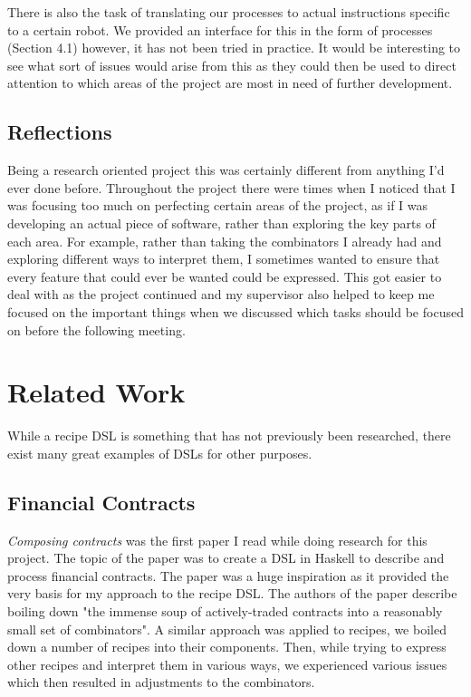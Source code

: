 \documentclass[11pt]{article}
\begin{document}
\medbreak

There is also the task of translating our processes to actual instructions specific to a certain
robot. We provided an interface for this in the form of processes (Section 4.1) however, it has not
been tried in practice. It would be interesting to see what sort of issues would arise from this
as they could then be used to direct attention to which areas of the project are most in need of
further development.

\subsection{Reflections}

Being a research oriented project this was certainly different from anything I'd ever done before.
Throughout the project there were times when I noticed that I was focusing too much on perfecting
certain areas of the project, as if I was developing an actual piece of software, rather than
exploring the key parts of each area. For example, rather than taking the combinators I already
had and exploring different ways to interpret them, I sometimes wanted to ensure that every feature
that could ever be wanted could be expressed. This got easier to deal with as the project
continued and my supervisor also helped to keep me focused on the important things when we discussed
which tasks should be focused on before the following meeting.

\section{Related Work}

While a recipe DSL is something that has not previously been researched, there exist many
great examples of DSLs for other purposes.

\subsection{Financial Contracts}

\textit{Composing contracts} \cite{contracts} was the first paper I read while doing
research for this project. The topic of the paper was to create a DSL in
Haskell to describe and process financial contracts. The paper was a huge
inspiration as it provided the very basis for my approach to the recipe DSL.
The authors of the paper describe boiling down "the immense soup of
actively-traded contracts into a reasonably small set of combinators".
A similar approach was applied to recipes, we boiled down a number of
recipes into their components. Then, while trying to express other
recipes and interpret them in various ways, we experienced various
issues which then resulted in adjustments to the combinators.
\end{document}
